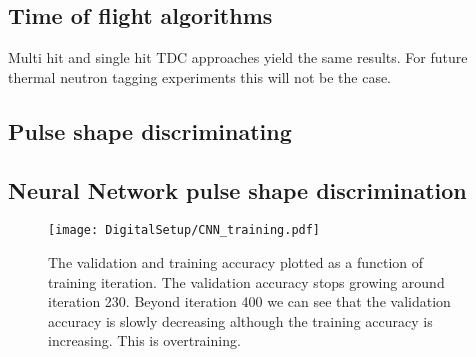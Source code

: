 \documentclass[main.tex]{subfiles}
\begin{document}
\subsection{Time of flight algorithms}
Multi hit and single hit TDC approaches yield the same results. For future thermal neutron tagging experiments this will not be the case.
\subsection{Pulse shape discriminating}
\subsection{Neural Network pulse shape discrimination}
\label{chap:cnn}
\begin{figure}[ht!]
    \centering
        \texttt{[image: DigitalSetup/CNN\_training.pdf]}
        \caption{The validation and training accuracy plotted as a function of training iteration. The validation accuracy stops growing around iteration 230. Beyond iteration 400 we can see that the validation accuracy is slowly decreasing although the training accuracy is increasing. This is overtraining.}
    \label{fig:CNN_training} 
\end{figure}
\end{document}
